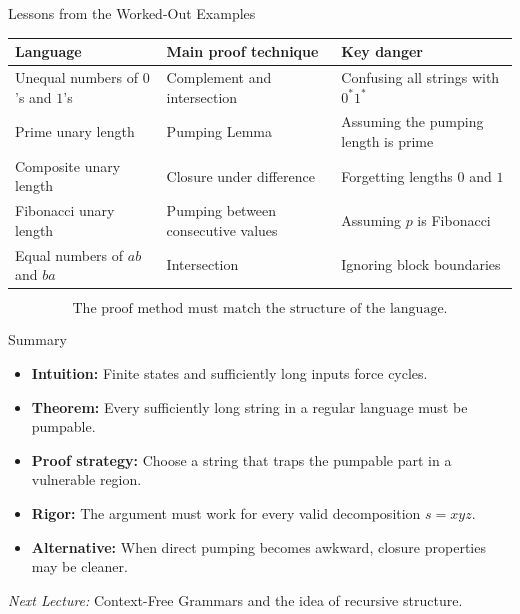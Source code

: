 \documentclass[10pt,aspectratio=169]{beamer}
\begin{document}
\begin{frame}{Lessons from the Worked-Out Examples}

\small
\begin{center}
\renewcommand{\arraystretch}{1.35}
\begin{tabular}{p{4.0cm}p{5.0cm}p{4.3cm}}
\toprule
\textbf{Language} &
\textbf{Main proof technique} &
\textbf{Key danger} \\
\midrule

Unequal numbers of \(0\)'s and \(1\)'s &
Complement and intersection &
Confusing all strings with \(0^*1^*\) \\

Prime unary length &
Pumping Lemma &
Assuming the pumping length is prime \\

Composite unary length &
Closure under difference &
Forgetting lengths \(0\) and \(1\) \\

Fibonacci unary length &
Pumping between consecutive values &
Assuming \(p\) is Fibonacci \\

Equal numbers of \(ab\) and \(ba\) &
Intersection &
Ignoring block boundaries \\

\bottomrule
\end{tabular}
\end{center}

\vspace{0.6em}
\[
\text{The proof method must match the structure of the language.}
\]

\end{frame}




\begin{frame}{Summary}

\begin{itemize}
    \item \textbf{Intuition:} Finite states and sufficiently long inputs force cycles.
    \item \textbf{Theorem:} Every sufficiently long string in a regular language must be pumpable.
    \item \textbf{Proof strategy:} Choose a string that traps the pumpable part in a vulnerable region.
    \item \textbf{Rigor:} The argument must work for every valid decomposition $s=xyz$.
    \item \textbf{Alternative:} When direct pumping becomes awkward, closure properties may be cleaner.
\end{itemize}

\vspace{1em}
\textit{Next Lecture:} Context-Free Grammars and the idea of recursive structure.

\end{frame}
\end{document}
